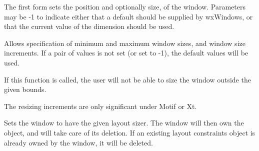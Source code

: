 The first form sets the position and optionally size, of the window.
Parameters may be -1 to indicate either that a default should be supplied
by wxWindows, or that the current value of the dimension should be used.




\label{wxwindowsetsizehints}


Allows specification of minimum and maximum window sizes, and window size increments.
If a pair of values is not set (or set to -1), the default values will be used.









If this function is called, the user will not be able to size the window outside the
given bounds.

The resizing increments are only significant under Motif or Xt.

\label{wxwindowsetsizer}


Sets the window to have the given layout sizer. The window
will then own the object, and will take care of its deletion.
If an existing layout constraints object is already owned by the
window, it will be deleted.

